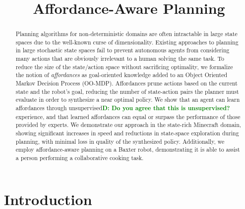 \documentclass[conference]{IEEEtran}
\newcommand{\dnote}[1]{\textcolor{Green}{\textbf{D: #1}}}
\begin{document}
\title{Affordance-Aware Planning}

\author{
}

\maketitle

\begin{abstract}
Planning algorithms for non-deterministic domains are often
intractable in large state spaces due to the well-known curse of
dimensionality. Existing approaches to planning in large stochastic
state spaces fail to prevent autonomous agents from considering many
actions that are obviously irrelevant to a human solving the same
task. To reduce the size of the state/action space without sacrificing
optimality, we formalize the notion of {\em affordances} as
goal-oriented knowledge added to an Object Oriented Markov Decision
Process (OO-MDP).  Affordances prune actions based on the current
state and the robot's goal, reducing the number of state-action pairs
the planner must evaluate in order to synthesize a near optimal
policy. We show that an agent can learn affordances through
unsupervised\dnote{Do you agree that this is unsupervised?} experience, and that learned affordances can equal or
surpass the performance of those provided by experts. We demonstrate
our approach in the state-rich Minecraft domain, showing significant
increases in speed and reductions in state-space exploration during
planning, with minimal loss in quality of the synthesized policy.
Additionally, we employ affordance-aware planning on a Baxter robot,
demonstrating it is able to assist a person performing a collaborative
cooking task.

\end{abstract}

\IEEEpeerreviewmaketitle

\section{Introduction}
\label{sec:introduction}
\end{document}
